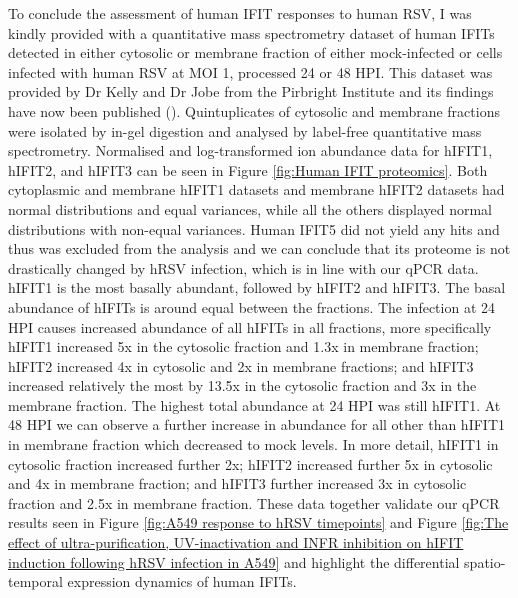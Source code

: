 To conclude the assessment of human IFIT responses to human RSV, I was kindly provided with a quantitative mass spectrometry dataset of human IFITs detected in either cytosolic or membrane fraction of either mock-infected or cells infected with human RSV at MOI 1, processed 24 or 48 HPI. This dataset was provided by Dr Kelly and Dr Jobe from the Pirbright Institute and its findings have now been published (\cite{Jobe2023ViralCondensates}). Quintuplicates of cytosolic and membrane fractions were isolated by in-gel digestion and analysed by label-free quantitative mass spectrometry. Normalised and log-transformed ion abundance data for hIFIT1, hIFIT2, and hIFIT3 can be seen in Figure \ref{fig:Human IFIT proteomics}. Both cytoplasmic and membrane hIFIT1 datasets and membrane hIFIT2 datasets had normal distributions and equal variances, while all the others displayed normal distributions with non-equal variances. Human IFIT5 did not yield any hits and thus was excluded from the analysis and we can conclude that its proteome is not drastically changed by hRSV infection, which is in line with our qPCR data. hIFIT1 is the most basally abundant, followed by hIFIT2 and hIFIT3. The basal abundance of hIFITs is around equal between the fractions. The infection at 24 HPI causes increased abundance of all hIFITs in all fractions, more specifically hIFIT1 increased 5x in the cytosolic fraction and 1.3x in membrane fraction; hIFIT2 increased 4x in cytosolic and 2x in membrane fractions; and hIFIT3 increased relatively the most by 13.5x in the cytosolic fraction and 3x in the membrane fraction. The highest total abundance at 24 HPI was still hIFIT1. At 48 HPI we can observe a further increase in abundance for all other than hIFIT1 in membrane fraction which decreased to mock levels. In more detail, hIFIT1 in cytosolic fraction increased further 2x; hIFIT2 increased further 5x in cytosolic and 4x in membrane fraction; and hIFIT3 further increased 3x in cytosolic fraction and 2.5x in membrane fraction. These data together validate our qPCR results seen in Figure \ref{fig:A549 response to hRSV timepoints} and Figure \ref{fig:The effect of ultra-purification, UV-inactivation and INFR inhibition on hIFIT induction following hRSV infection in A549} and highlight the differential spatio-temporal expression dynamics of human IFITs.

